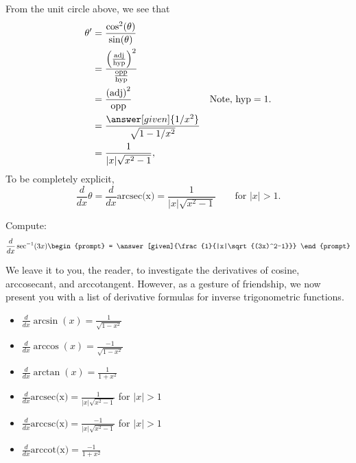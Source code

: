 \documentclass{ximera}
\begin{document}
\begin{theorem}
\begin{explanation}
\begin{image}
\end{image}
From the unit circle above, we see that 
\begin{align*}
  \theta' &= \frac{\cos^2(\theta)}{\sin(\theta)}\\
  &= \frac{
    \left(\frac{\mathrm{adj}}{\mathrm{hyp}}\right)^2}{\frac{\mathrm{opp}}{\mathrm{hyp}}}\\
  &= \frac{\left(\mathrm{adj}\right)^2}{\mathrm{opp}} &\text{Note, $\mathrm{hyp}=1$.}\\
  &= \frac{\answer[given]{1/x^2}}{\sqrt{1-1/x^2}}\\
  &= \frac{1}{|x|\sqrt{x^2-1}},
\end{align*}
To be completely explicit, 
\[
\frac{d}{dx} \theta = \frac{d}{dx} \text{arcsec(x)} = \frac{1}{|x|\sqrt{x^2-1}}\qquad\text{for $|x|>1$}. 
\]
\end{explanation}
\end{theorem}

\begin{question}
  Compute:
  \[
  \frac{d}{dx} \sec^{-1}(3x)
  \begin{prompt}
    = \answer[given]{\frac{1}{|x|\sqrt{(3x)^2-1}}}
  \end{prompt}
  \]
\end{question}

We leave it to you, the reader, to investigate the derivatives of
cosine, arccosecant, and arccotangent. However, as a gesture of
friendship, we now present you with a list of derivative formulas for
inverse trigonometric functions.

\begin{theorem} \hfil
\begin{itemize}
\item $\frac{d}{dx} \arcsin(x) = \frac{1}{\sqrt{1-x^2}}$
\item $\frac{d}{dx} \arccos(x) = \frac{-1}{\sqrt{1-x^2}}$
\item $\frac{d}{dx} \arctan(x) = \frac{1}{1+x^2}$
\item $\frac{d}{dx} \text{arcsec(x)} = \frac{1}{|x|\sqrt{x^2-1}}$ for $|x|>1$
\item $\frac{d}{dx} \text{arccsc(x)} = \frac{-1}{|x|\sqrt{x^2-1}}$ for $|x|>1$
\item $\frac{d}{dx} \text{arccot(x)} = \frac{-1}{1+x^2}$
\end{itemize}
\end{theorem}
\end{document}
